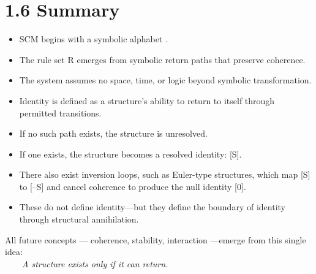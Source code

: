\section{1.6 \textbar{} Summary}\label{summary}

\begin{itemize}
\item
  SCM begins with a symbolic alphabet \Sigma.
\item
  The rule set R emerges from symbolic return paths that preserve
  coherence.
\item
  The system assumes no space, time, or logic beyond symbolic
  transformation.
\item
  Identity is defined as a structure's ability to return to itself
  through permitted transitions.
\item
  If no such path exists, the structure is unresolved.
\item
  If one exists, the structure becomes a resolved identity: {[}S{]}.
\item
  There also exist inversion loops, such as Euler-type structures, which
  map {[}S{]} to {[}--S{]} and cancel coherence to produce the null
  identity {[}0{]}.
\item
  These do not define identity---but they define the boundary of
  identity through structural annihilation.
\end{itemize}

All future concepts --- coherence, stability, interaction ---emerge from
this single idea:\\
  \emph{A structure exists only if it can return.}